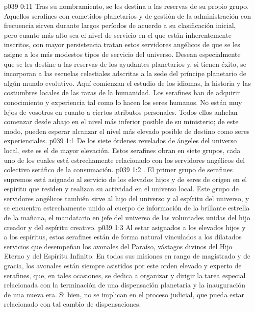 \vs p039 0:11 Tras su nombramiento, se les destina a las reservas de su propio grupo. Aquellos serafines con cometidos planetarios y de gestión de la administración con frecuencia sirven durante largos períodos de acuerdo a su clasificación inicial, pero cuanto más alto sea el nivel de servicio en el que están inherentemente inscritos, con mayor persistencia tratan estos servidores angélicos de que se les asigne a los más modestos tipos de servicio del universo. Desean especialmente que se les destine a las reservas de los ayudantes planetarios y, si tienen éxito, se incorporan a las escuelas celestiales adscritas a la sede del príncipe planetario de algún mundo evolutivo. Aquí comienzan el estudio de los idiomas, la historia y las costumbres locales de las razas de la humanidad. Los serafines han de adquirir conocimiento y experiencia tal como lo hacen los seres humanos. No están muy lejos de vosotros en cuanto a ciertos atributos personales. Todos ellos anhelan comenzar desde abajo en el nivel más inferior posible de su ministerio; de este modo, pueden esperar alcanzar el nivel más elevado posible de destino como seres experienciales.
\vs p039 1:1 De los siete órdenes revelados de ángeles del universo local, este es el de mayor elevación. Estos serafines obran en siete grupos, cada uno de los cuales está estrechamente relacionado con los servidores angélicos del colectivo seráfico de la consumación.
\vs p039 1:2 . El primer grupo de serafines supremos está asignado al servicio de los elevados hijos y de seres de origen en el espíritu que residen y realizan su actividad en el universo local. Este grupo de servidores angélicos también sirve al hijo del universo y al espíritu del universo, y se encuentra estrechamente unido al cuerpo de información de la brillante estrella de la mañana, el mandatario en jefe del universo de las voluntades unidas del hijo creador y del espíritu creativo.
\vs p039 1:3 Al estar asignados a los elevados hijos y a los espíritus, estos serafines están de forma natural vinculados a los dilatados servicios que desempeñan los avonales del Paraíso, vástagos divinos del Hijo Eterno y del Espíritu Infinito. En todas sus misiones en rango de magistrado y de gracia, los avonales están siempre asistidos por este orden elevado y experto de serafines, que, en tales ocasiones, se dedica a organizar y dirigir la tarea especial relacionada con la terminación de una dispensación planetaria y la inauguración de una nueva era. Si bien, no se implican en el proceso judicial, que pueda estar relacionado con tal cambio de dispensaciones.
